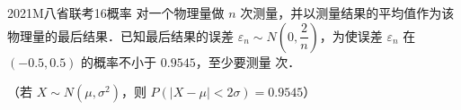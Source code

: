 
\begin{problem}{2021}{M}{八省联考}{16}{概率}
对一个物理量做 $ n $ 次测量，并以测量结果的平均值作为该物理量的最后结果．已知最后结果的误差 $\varepsilon_n \sim N\left(0,\dfrac{2}{n}\right)$，为使误差 $\varepsilon_n $ 在 $ (-0.5,0.5)$ 的概率不小于 $ 0.9545 $，至少要测量 \underline{\hspace{4em}} 次．

（若 $X \sim N(\mu,\sigma^2) $，则 $ P(|X-\mu|<2\sigma)=0.9545$）
\end{problem}

\begin{answer}

\end{answer}

\begin{solutions}

\end{solutions}